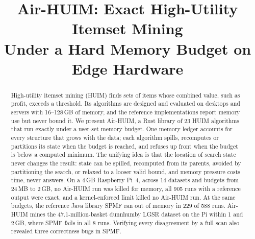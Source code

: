 \documentclass[conference]{IEEEtran}
\begin{document}
\title{Air-HUIM: Exact High-Utility Itemset Mining\\Under a Hard Memory Budget on Edge Hardware}

\author{
\and
{}
\and
\IEEEauthorblockN{\phantom{Name}}
}

\maketitle

\begin{abstract}
High-utility itemset mining (HUIM) finds sets of items whose combined value, such as profit,
exceeds a threshold. Its algorithms are designed and evaluated on desktops and servers with
16--128\,GB of memory, and the reference implementations report memory use but never bound it.
We present Air-HUIM, a Rust library of 23 HUIM algorithms that run exactly under a
user-set memory budget. One memory ledger accounts for every structure that grows with the data;
each algorithm spills, recomputes or partitions its state when the budget is reached, and refuses
up front when the budget is below a computed minimum. The unifying idea is that the location of search
state never changes the result: state can be spilled, recomputed from its parents, avoided by
partitioning the search, or relaxed to a looser valid bound, and memory pressure costs time,
never answers. On a 4\,GB Raspberry
Pi~4, across 14 datasets and budgets from 24\,MB to 2\,GB, no Air-HUIM run was killed for
memory, all 905 runs with a reference output were exact, and a kernel-enforced limit killed no
Air-HUIM run. At the same budgets, the reference Java library SPMF ran out of memory in 229 of
588 runs. Air-HUIM mines the 47.1-million-basket dunnhumby LGSR dataset on the Pi within 1 and
2\,GB, where SPMF fails in all 8 runs. Verifying every disagreement by a full scan also revealed
three correctness bugs in SPMF.
\end{abstract}
\end{document}
